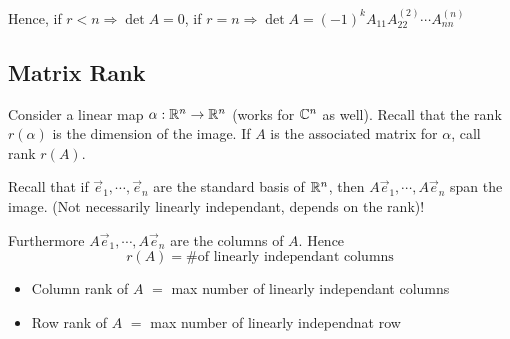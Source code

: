 \documentclass{article}
\numberwithin{equation}{section}
\begin{document}
Hence, if $r < n \Rightarrow \det A = 0$, if $r = n \Rightarrow \det A = (-1)^kA_{11}A^{(2)}_{22} \cdots A^{(n)}_{nn}$

\subsection{Matrix Rank}
Consider a linear map $\alpha: \mathbb{R}^n \rightarrow \mathbb{R}^n$ (works for $\mathbb{C}^n$ as well). 
Recall that the rank $r(\alpha)$ is the dimension of the image.
If $A$ is the associated matrix for $\alpha$, call rank $r(A)$.

Recall that if $\vec e_1, \cdots, \vec e_n$ are the standard basis of $\mathbb{R}^n$, 
then $A\vec e_1, \cdots, A\vec e_n$ span the image. (Not necessarily linearly independant, depends on the rank)!

Furthermore $A\vec e_1, \cdots, A\vec e_n$ are the columns of $A$. Hence
\begin{equation}\label{eq:4-11}
    r(A) = \text{\# of linearly independant columns}
\end{equation}

\begin{defi}\leavevmode
    \begin{itemize}
        \item Column rank of $A$ $=$ max number of linearly independant columns
        \item Row rank of $A$ $=$ max number of linearly independnat row
    \end{itemize}
\end{defi}
\end{document}
